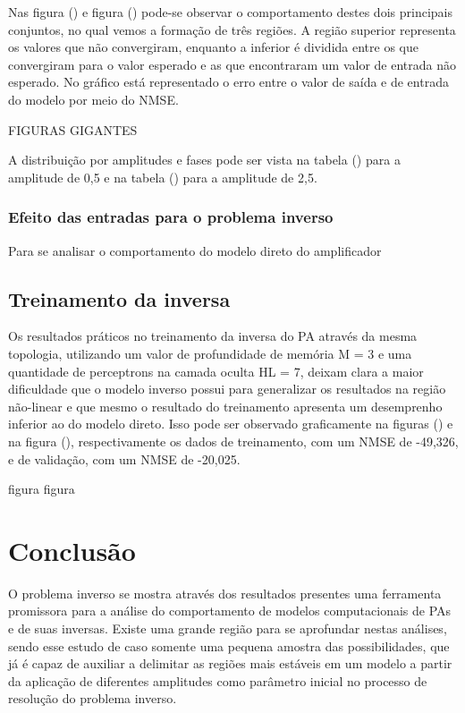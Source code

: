 Nas figura () e figura () pode-se observar o comportamento destes dois principais conjuntos, no qual vemos a formação de três regiões. A região superior representa os valores que não convergiram, enquanto a inferior é dividida entre os que convergiram para o valor esperado e as que encontraram um valor de entrada não esperado. No gráfico está representado o erro entre o valor de saída e de entrada do modelo por meio do NMSE.

FIGURAS GIGANTES

A distribuição por amplitudes e fases pode ser vista na tabela () para a amplitude de 0,5 e na tabela () para a amplitude de 2,5.


\subsection{Efeito das entradas para o problema inverso} \label{subsec:estudoi-pi-entradas}
Para se analisar o comportamento do modelo direto do amplificador 

\section{Treinamento da inversa} \label{sec:estudoi-inv}
Os resultados práticos no treinamento da inversa do PA através da mesma topologia, utilizando um valor de profundidade de memória M = 3 e uma quantidade de perceptrons na camada oculta HL = 7, deixam clara a maior dificuldade que o modelo inverso possui para generalizar os resultados na região não-linear e que mesmo o resultado do treinamento apresenta um desemprenho inferior ao do modelo direto. Isso pode ser observado graficamente na figuras () e na figura (), respectivamente os dados de treinamento, com um NMSE de -49,326, e de validação, com um NMSE de -20,025.

figura
figura

\chapter{Conclusão} \label{cha:conclusao}
O problema inverso se mostra através dos resultados presentes uma ferramenta promissora para a análise do comportamento de modelos computacionais de PAs e de suas inversas. Existe uma grande região para se aprofundar nestas análises, sendo esse estudo de caso somente uma pequena amostra das possibilidades, que já é capaz de auxiliar a delimitar as regiões mais estáveis em um modelo a partir da aplicação de diferentes amplitudes como parâmetro inicial no processo de resolução do problema inverso.